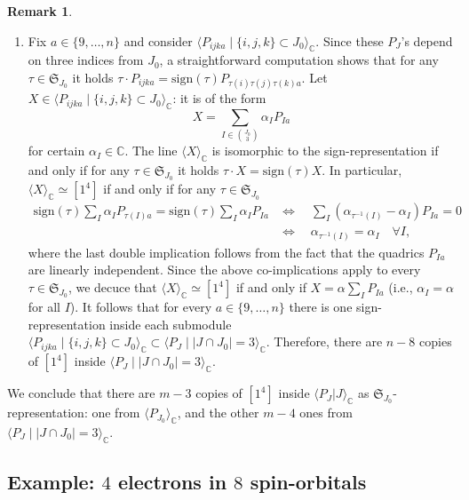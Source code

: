\documentclass[11pt,reqno]{amsart}
\theoremstyle{definition}
\newtheorem{remark}[theorem]{Remark}
\numberwithin{theorem}{section}
\newcommand{\sign}{\mathrm{sign}}
\numberwithin{equation}{section}
\begin{document}
\begin{remark}
\begin{enumerate}
\item Fix $a \in \{9, \ldots , n\}$ and consider $\langle P_{ijka} \mid \{i,j,k\} \subset J_0\rangle_\mathbb C$. Since these $P_J$'s depend on three indices from $J_0$, a straightforward computation shows that for any $\tau \in \mathfrak{S}_{J_0}$ it holds $\tau \cdot P_{ijka} = \sign(\tau)P_{\tau(i)\tau(j)\tau(k)a}$. Let $X \in \langle P_{ijka} \mid \{i,j,k\}\subset J_0 \rangle_{\mathbb C}$: it is of the form
\[ X= \sum_{I \in \binom{J_0}{3}}\alpha_I P_{Ia} \]
for certain $\alpha_I \in \mathbb C$. The line $\langle X \rangle_\mathbb C$ is isomorphic to the sign-representation if and only if for any $\tau \in \mathfrak{S}_{J_0}$ it holds $\tau \cdot X = \sign(\tau)X$. In particular, $\langle X\rangle_\mathbb C\simeq [1^4]$ if and only if for any $\tau \in \mathfrak{S}_{J_0}$
\begin{align*}
\sign(\tau)\sum_I\alpha_IP_{\tau(I)a} = \sign(\tau) \sum_I \alpha_I P_{Ia} & \iff \quad \sum_{I} (\alpha_{\tau^{-1}(I)}-\alpha_I)P_{Ia} = 0 \\
& \iff \quad \alpha_{\tau^{-1}(I)} = \alpha_I  \quad \forall I,
\end{align*}
where the last double implication follows from the fact that the quadrics $P_{Ia}$ are linearly independent. Since the above co-implications apply to every $\tau \in \mathfrak{S}_{J_0}$, we decuce that $\langle X \rangle_{\mathbb C}\simeq [1^4]$ if and only if $X=\alpha \sum_I P_{Ia}$ (i.e., $\alpha_I=\alpha$ for all $I$). It follows that for every $a \in \{9,\ldots, n\}$ there is one sign-representation inside each submodule $\langle P_{ijka} \mid \{i,j,k\} \subset J_0\rangle_\mathbb C \subset \langle P_J \mid |J\cap J_0|=3\rangle_\mathbb C$. Therefore, there are $n-8$ copies of $[1^4]$ inside $\langle P_J \mid |J\cap J_0|=3\rangle_\mathbb C$.
\end{enumerate}
\indent We conclude that there are $m-3$ copies of $[1^4]$ inside $\langle P_J|J\rangle_\mathbb C$ as $\mathfrak{S}_{J_0}$-representation: one from $\langle P_{J_0}\rangle_\mathbb C$, and the other $m-4$ ones from $\langle P_J \mid |J\cap J_0|=3\rangle_\mathbb C$.
\end{remark}

\subsection{Example: $4$ electrons in $8$ spin-orbitals}
\end{document}

